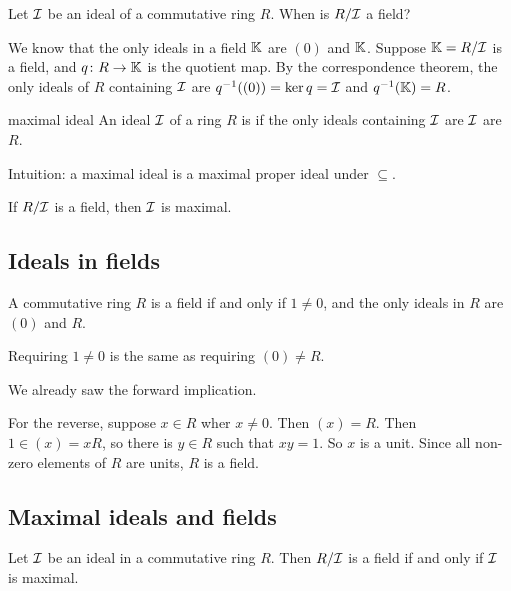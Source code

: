 \documentclass[12pt,letterpaper]{report}
\begin{document}
Let $\mathcal{I}$ be an ideal of a commutative ring $R$.
When is $R/\mathcal{I}$ a field?

We know that the only ideals in a field $\mathbb{K}$ are $(0)$ and $\mathbb{K}$.
Suppose $\mathbb{K} = R/\mathcal{I}$ is a field, and $q \colon R \to \mathbb{K}$ is the quotient map.
By the correspondence theorem, the only ideals of $R$ containing $\mathcal{I}$ are
$q^{-1}((0)) = \ker q = \mathcal{I}$ and $q^{-1}(\mathbb{K}) = R$.

\begin{defn}{maximal ideal}{}
  An ideal $\mathcal{I}$ of a ring $R$ is  if the only ideals containing $\mathcal{I}$ are
  $\mathcal{I}$ are $R$.
\end{defn}

Intuition: a maximal ideal is a maximal proper ideal under $\subseteq$.

\begin{lem}{}{}
  If $R/\mathcal{I}$ is a field, then $\mathcal{I}$ is maximal.
\end{lem}

\pagebreak
\subsection{Ideals in fields}

\begin{prop}{}{}
  A commutative ring $R$ is a field if and only if $1 \neq 0$, and the only ideals in $R$ are $(0)$
  and $R$.
\end{prop}

Requiring $1 \neq 0$ is the same as requiring $(0) \neq R$.

\begin{thmproof}
  We already saw the forward implication.

  For the reverse, suppose $x \in R$ wher $x \neq 0$.
  Then $(x) = R$.
  Then $1 \in (x) = xR$, so there is $y \in R$ such that $xy = 1$.
  So $x$ is a unit.
  Since all non-zero elements of $R$ are units, $R$ is a field.
\end{thmproof}

\pagebreak
\subsection{Maximal ideals and fields}

\begin{thm}{}{}
  Let $\mathcal{I}$ be an ideal in a commutative ring $R$.
  Then $R/\mathcal{I}$ is a field if and only if $\mathcal{I}$ is maximal.
\end{thm}
\end{document}
